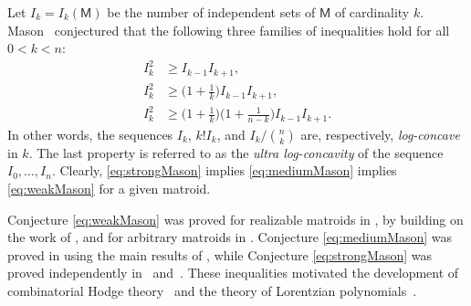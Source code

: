 \documentclass{amsart}
\theoremstyle{definition}
\theoremstyle{remark}
\newcommand{\M}{\mathsf{M}}    %
\newcommand{\1}{\mathbf{1}}
\numberwithin{equation}{section}
\begin{document}
Let $I_k=I_{k}(\M)$ be the number of
independent sets of $\M$ of cardinality $k$. 
Mason~\cite{Mason72}
conjectured that the following three families of inequalities hold for all $0<k<n$:
\begin{align}
  I_k^2&\geq I_{k-1}I_{k+1}, \tag{M1} \label{eq:weakMason}\\
  I_k^2 &\geq \Big(1+\frac1k\Big)I_{k-1}I_{k+1}, \tag{M2}
  \label{eq:mediumMason}\\
  I_k^2 & \geq \Big(1+\frac1k\Big)\Big(1+\frac1{n-k}\Big)I_{k-1}I_{k+1}. \tag{M3}\label{eq:strongMason}
\end{align}
In other words, the sequences $I_k$, $k!I_k$, and
$I_k/\binom{n}{k}$ are, respectively, \emph{log-concave} in $k$. The last property is referred to as the \emph{ultra log-concavity} of the sequence $I_0,\ldots,I_n$. Clearly, \eqref{eq:strongMason} implies \eqref{eq:mediumMason} implies \eqref{eq:weakMason} for a given matroid.

Conjecture \eqref{eq:weakMason} was proved for realizable matroids in \cite{Lenz13}, by building on the work of \cite{HK12}, and for arbitrary matroids in \cite{AHK18}. Conjecture \eqref{eq:mediumMason} was proved  in \cite{HSW22} using the main results of \cite{AHK18}, while Conjecture \eqref{eq:strongMason} was proved independently in~\cite{ALOVIII} and~\cite{BH20}. These inequalities motivated the development of combinatorial Hodge theory~\cite{AHK18} and the theory of Lorentzian polynomials~\cite{BH20}.
\end{document}
